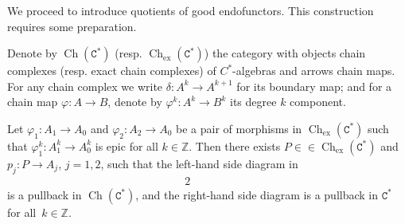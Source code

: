 \documentclass[10pt]{simplearticle}
\newcommand{\tikzinput}[1]{}
\newcommand{\Cstar}{\mathtt{C^{*}}}
\newcommand{\Ch}{\operatorname{Ch}}
\newcommand{\chex}{\Ch_{\operatorname{ex}}}
\begin{document}
We proceed to introduce quotients of good endofunctors. This construction
requires some preparation.

Denote by $\Ch(\Cstar)$ (resp. $\chex(\Cstar)$) the category with
objects chain complexes (resp. exact chain complexes) of $C^{*}$-algebras
and arrows chain maps. For any chain complex we write
$\delta\colon A^{k}\to A^{k+1}$ for its boundary map; and for a chain
map $\varphi\colon A\to B$, denote by $\varphi^{k}\colon A^{k}\to B^{k}$
its degree $k$ component.
\begin{lem}\label{lem:chain-pullback}
Let $\varphi_{1}\colon A_{1}\to A_{0}$
and $\varphi_{2}\colon A_{2}\to A_{0}$ be a pair of morphisms in
$\chex(\Cstar)$ such that $\varphi^{k}_{1}\colon A^{k}_{1}\to A^{k}_{0}$
is epic for all $k\in\mathbb{Z}$. Then there exists $P\in\in\chex(\Cstar)$
and $p_{j}\colon P\to A_{j}$, $j=1,2$, such that the left-hand side
diagram in
\begin{alignat}{2}
\tikzinput{d192} & \qquad & \tikzinput{d201}\label{eq:chain-pullback}
\end{alignat}
is a pullback in $\Ch(\Cstar)$, and the right-hand side diagram is
a pullback in $\Cstar$ for all~$k\in\mathbb{Z}$.
\end{lem}
\end{document}
